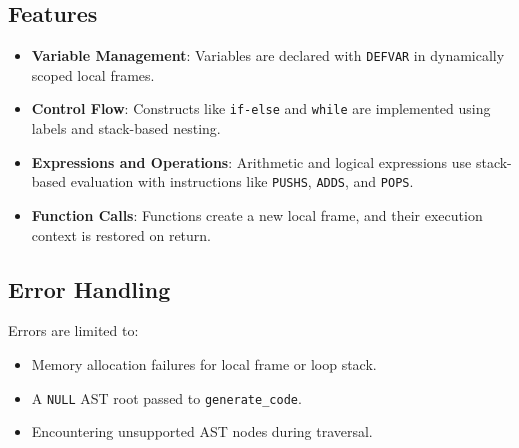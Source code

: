 \documentclass[12pt,a4paper]{article}
\begin{document}
\subsection{Features}
\begin{itemize}
    \item \textbf{Variable Management}: Variables are declared with \texttt{DEFVAR} in dynamically scoped local frames.
    \item \textbf{Control Flow}: Constructs like \texttt{if-else} and \texttt{while} are implemented using labels and stack-based nesting.
    \item \textbf{Expressions and Operations}: Arithmetic and logical expressions use stack-based evaluation with instructions like \texttt{PUSHS}, \texttt{ADDS}, and \texttt{POPS}.
    \item \textbf{Function Calls}: Functions create a new local frame, and their execution context is restored on return.
\end{itemize}

\subsection{Error Handling}
Errors are limited to:
\begin{itemize}
    \item Memory allocation failures for local frame or loop stack.
    \item A \texttt{NULL} AST root passed to \texttt{generate\_code}.
    \item Encountering unsupported AST nodes during traversal.
\end{itemize}

\printbibliography
\end{document}
